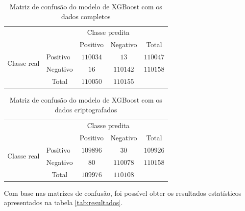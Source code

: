 \documentclass[12pt]{article}
\begin{document}
\begin{table}[h]
    \centering
    \begin{tabular}{l|l|c|c|c}
        \multicolumn{2}{c}{}&\multicolumn{2}{c}{Classe predita}&\\
        \cline{3-4}
        \multicolumn{2}{c|}{}&Positivo&Negativo&\multicolumn{1}{c}{Total}\\
        \cline{2-4}
        \multirow{2}{*}{Classe real}& Positivo & $110034$ & $13$ & $110047$\\
        \cline{2-4}
        & Negativo & $16$ & $110142$ & $110158$\\
        \cline{2-4}
        \multicolumn{1}{c}{} & \multicolumn{1}{c}{Total} & \multicolumn{1}{c}{$110050$}
        & \multicolumn{1}{c}{$110155$}\\
    \end{tabular}
    \caption{Matriz de confusão do modelo de XGBoost com os dados completos}
    \label{tab:cm_completo}
\end{table}

\begin{table}[h]
    \centering
    \begin{tabular}{l|l|c|c|c}
        \multicolumn{2}{c}{}&\multicolumn{2}{c}{Classe predita}&\\
        \cline{3-4}
        \multicolumn{2}{c|}{}&Positivo&Negativo&\multicolumn{1}{c}{Total}\\
        \cline{2-4}
        \multirow{2}{*}{Classe real}& Positivo & $109896$ & $30$ & $109926$\\
        \cline{2-4}
        & Negativo & $80$ & $110078$ & $110158$\\
        \cline{2-4}
        \multicolumn{1}{c}{} & \multicolumn{1}{c}{Total} & \multicolumn{1}{c}{$109976$}
        & \multicolumn{1}{c}{$110108$}\\
    \end{tabular}
    \caption{Matriz de confusão do modelo de XGBoost com os dados criptografados}
    \label{tab:cm_criptografado}
\end{table}


Com base nas matrizes de confusão, foi possível obter os resultados estatísticos apresentados na tabela \ref{tab:resultados}.
\end{document}
